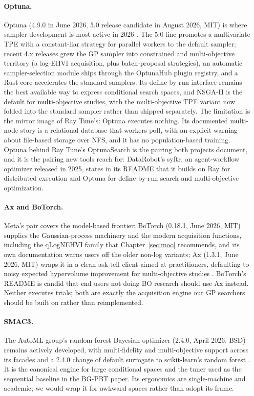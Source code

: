 \paragraph{Optuna.}
Optuna (4.9.0 in June 2026, 5.0 release candidate in August 2026, MIT) is
where sampler development is most active in 2026
\citep{akiba2019optuna}. The 5.0 line promotes a multivariate TPE with a
constant-liar strategy for parallel workers to the default sampler;
recent 4.x releases grew the GP sampler into constrained and
multi-objective territory (a log-EHVI acquisition, plus batch-proposal
strategies), an automatic sampler-selection module ships through the
OptunaHub plugin registry, and a Rust core accelerates the standard
samplers. Its define-by-run interface remains the best available way to
express conditional search spaces, and NSGA-II is the default for
multi-objective studies, with the multi-objective TPE variant
\citep{ozaki2020motpe} now folded into the standard sampler rather than
shipped separately. The limitation is the mirror image of Ray
Tune's: Optuna executes nothing. Its documented multi-node story is a
relational database that workers poll, with an explicit warning about
file-based storage over NFS, and it has no population-based training.
Optuna behind Ray Tune's OptunaSearch is the pairing both projects
document, and it is the pairing new tools reach for: DataRobot's syftr,
an agent-workflow optimizer released in 2025, states in its README that
it builds on Ray for distributed execution and Optuna for
define-by-run search and multi-objective optimization.

\paragraph{Ax and BoTorch.}
Meta's pair covers the model-based frontier: BoTorch (0.18.1, June 2026,
MIT) supplies the Gaussian-process machinery and the modern acquisition
functions, including the qLogNEHVI family that Chapter~\ref{sec:moo}
recommends, and its own documentation warns users off the older
non-log variants; Ax (1.3.1, June 2026, MIT) wraps it in a clean ask-tell
client aimed at practitioners, defaulting to noisy expected hypervolume
improvement for multi-objective studies
\citep{balandat2020botorch}. BoTorch's README is candid that end users
not doing BO research should use Ax instead. Neither executes trials;
both are exactly the acquisition engine our GP searchers should be built
on rather than reimplemented.

\paragraph{SMAC3.}
The AutoML group's random-forest Bayesian optimizer (2.4.0, April 2026,
BSD) remains actively developed, with multi-fidelity and multi-objective
support across its facades and a 2.4.0 change of default surrogate to
scikit-learn's random forest \citep{lindauer2022smac3}. It is the
canonical engine for large conditional spaces and the tuner used as the
sequential baseline in the BG-PBT paper. Its ergonomics are single-machine
and academic; we would wrap it for awkward spaces rather than adopt its
frame.

